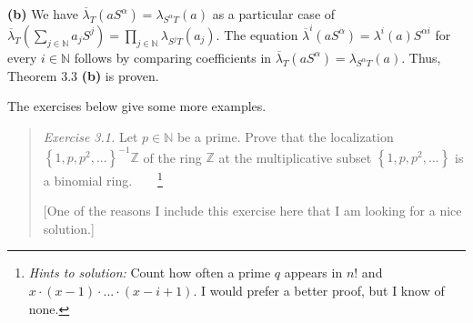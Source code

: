 \documentclass[12pt,final,notitlepage,onecolumn,german]{article}%
\begin{document}
\textbf{(b)} We have $\overline{\lambda}_{T}\left(  aS^{\alpha}\right)
=\lambda_{S^{\alpha}T}\left(  a\right)  $ as a particular case of
$\overline{\lambda}_{T}\left(  \sum\limits_{j\in\mathbb{N}}a_{j}S^{j}\right)
=\prod\limits_{j\in\mathbb{N}}\lambda_{S^{j}T}\left(  a_{j}\right)  $. The
equation $\overline{\lambda}^{i}\left(  aS^{\alpha}\right)  =\lambda
^{i}\left(  a\right)  S^{\alpha i}$ for every $i\in\mathbb{N}$ follows by
comparing coefficients in $\overline{\lambda}_{T}\left(  aS^{\alpha}\right)
=\lambda_{S^{\alpha}T}\left(  a\right)  $. Thus, Theorem 3.3 \textbf{(b)} is proven.

The exercises below give some more examples.

\begin{quotation}
\textit{Exercise 3.1.} Let $p\in\mathbb{N}$ be a prime. Prove that the
localization $\left\{  1,p,p^{2},...\right\}  ^{-1}\mathbb{Z}$ of the ring
$\mathbb{Z}$ at the multiplicative subset $\left\{  1,p,p^{2},...\right\}  $
is a binomial ring.\ \ \ \ \footnote{\textit{Hints to solution:} Count how
often a prime $q$ appears in $n!$ and $x\cdot\left(  x-1\right)  \cdot
...\cdot\left(  x-i+1\right)  $. I would prefer a better proof, but I know of
none.}

[One of the reasons I include this exercise here that I am looking for a nice solution.]


\end{quotation}
\end{document}
